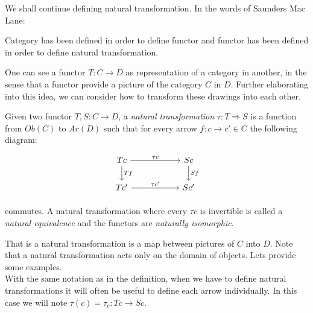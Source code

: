 We shall continue defining natural transformation. In the words of Saunders Mac Lane:

\begin{displayquote}
Category has been defined in order to define functor and functor has been defined in order to define natural transformation.
\end{displayquote}




One can see a functor $T:C\to D$ as representation of a category in another, in the sense that a functor provide a picture of the category $C$ in $D$. Further elaborating into this idea, we can consider how to transform these drawings into each other. 

\begin{definition}
  Given two functor $T,S:C\to D$, a \emph{natural transformation} $\tau : T \Rightarrow S$ is a function from $Ob(C)$ to $Ar(D)$ such that for every arrow $f:c \to c' \in C$ the following diagram:
\[
  \begin{tikzpicture}
  \node {\begin{tikzcd}[column sep=20mm]
      Tc\ar[r,"\tau c"]\ar[d,"Tf"] & Sc\ar[d,"Sf"]\\
      Tc'\ar[r,"\tau c'"] & Sc'
  \end{tikzcd}};
\end{tikzpicture}
\]

commutes. A natural transformation where every $\tau c$ is invertible is called a \emph{natural equivalence} and the functors are \emph{naturally isomorphic}.
  \end{definition}


  That is a natural transformation is a map between pictures of $C$ into $D$. Note that a natural transformation acts only on the domain of objects. Lets provide some examples.\\

  With the same notation as in the definition, when we have to define natural transformations  it will often be useful to define each arrow individually. In this case we will note $\tau(c) = \tau_c: Tc \to Sc$. 

